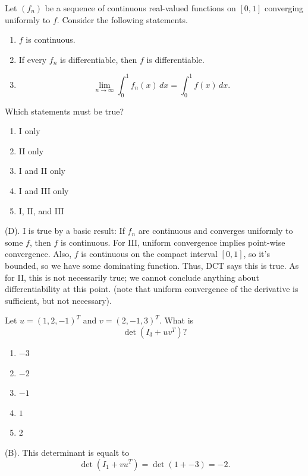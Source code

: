 \begin{exercise}
Let $(f_n)$ be a sequence of continuous real-valued functions on $[0,1]$
converging uniformly to $f$. Consider the following statements.
\begin{enumerate}[label=\Roman*.]
    \item $f$ is continuous.

    \item If every $f_n$ is
    differentiable, then $f$ is
    differentiable.

    \item
    \[
    \lim_{n\to\infty}
    \int_0^1 f_n(x)\,dx
    =
    \int_0^1 f(x)\,dx.
    \]
\end{enumerate}
Which statements must be true?
\begin{enumerate}[label=(\Alph*)]
    \item I only
    \item II only
    \item I and II only
    \item I and III only
    \item I, II, and III
\end{enumerate}
\end{exercise}
\begin{solution}
(D). I is true by a basic result: If $f_n$ are continuous and converges uniformly to some $f$,
then $f$ is continuous. For III, uniform convergence implies point-wise convergence.
Also, $f$ is continuous on the compact interval $[0,1]$, so it's bounded, so we have some dominating function. 
Thus, DCT says this is true. As for II, this is not necessarily true; we cannot conclude anything about 
differentiability at this point. (note that uniform convergence of the derivative is sufficient, but not necessary).
\end{solution}

\begin{exercise}
Let $u=(1,2,-1)^T$ and $v=(2,-1,3)^T$.
What is
\[
\det(I_3+uv^T)?
\]
\begin{enumerate}[label=(\Alph*)]
\item $-3$
\item $-2$
\item $-1$
\item $1$
\item $2$
\end{enumerate}
\end{exercise}
\begin{solution}
(B). This determinant is equalt to 
\[
\det(I_1 + vu^T) = \det(1 + -3) = -2.
\]
\end{solution}

